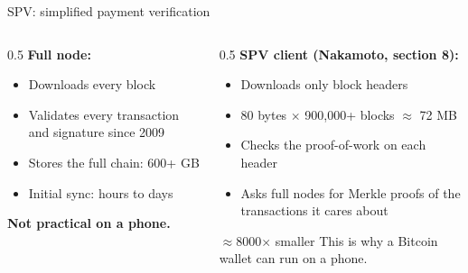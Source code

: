 \ifdefined\PRESENTATION\else\PassOptionsToClass{handout}{beamer}\fi\documentclass[aspectratio=169, lualatex]{beamer}
\begin{document}
\begin{frame}{SPV: simplified payment verification}
	\begin{columns}[c]
		\begin{column}{0.5\textwidth}
			\textbf{Full node:}
			\begin{itemize}
				\item Downloads every block
				\item Validates every transaction and signature since 2009
				\item Stores the full chain: 600+ GB
				\item Initial sync: hours to days
			\end{itemize}
			\textbf{Not practical on a phone.}
		\end{column}
		\begin{column}{0.5\textwidth}
			\textbf{SPV client (Nakamoto, section 8):}
			\begin{itemize}
				\item Downloads only block headers
				\item 80 bytes $\times$ 900,000+ blocks $\approx$ 72 MB
				\item Checks the proof-of-work on each header
				\item Asks full nodes for Merkle proofs of the transactions it cares about
			\end{itemize}
			\begin{exampleblock}{$\approx$8000$\times$ smaller}
				This is why a Bitcoin wallet can run on a phone.
			\end{exampleblock}
		\end{column}
	\end{columns}
\end{frame}
\end{document}
